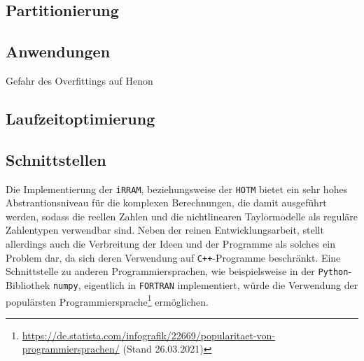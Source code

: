 \subsection{Partitionierung}


\subsection{Anwendungen}
Gefahr des Overfittings auf Henon




\subsection{Laufzeitoptimierung}



\subsection{Schnittstellen}
Die Implementierung der \verb+iRRAM+, beziehungsweise der \verb+HOTM+ bietet ein sehr hohes Abstrantionsniveau für die komplexen Berechnungen, die damit ausgeführt werden, sodass die reellen Zahlen und die nichtlinearen Taylormodelle als reguläre Zahlentypen verwendbar sind. Neben der reinen Entwicklungsarbeit, stellt allerdings auch die Verbreitung der Ideen und der Programme als solches ein Problem dar, da sich deren Verwendung auf \verb.C++.-Programme beschränkt. Eine Schnittstelle zu anderen Programmiersprachen, wie beispielsweise in der \verb+Python+-Bibliothek \verb+numpy+, eigentlich in \verb+FORTRAN+ implementiert, würde die Verwendung der populärsten Programmiersprache\footnote{\url{https://de.statista.com/infografik/22669/popularitaet-von-programmiersprachen/} (Stand 26.03.2021)} ermöglichen.

